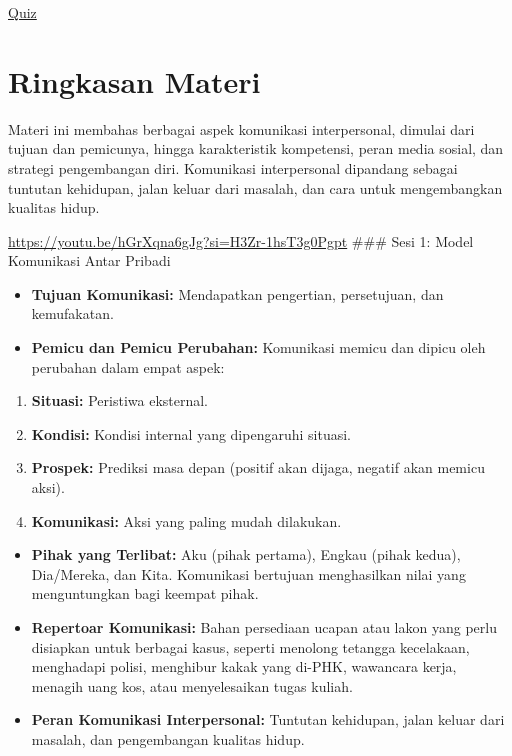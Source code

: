 \documentclass[
  letterpaper,
  DIV=11,
  numbers=noendperiod]{scrreprt}
\providecommand{\tightlist}{%
  \setlength{\itemsep}{0pt}\setlength{\parskip}{0pt}}
\begin{document}
\href{https://forms.office.com/r/WCHBJJiwXc}{Quiz}

\section{Ringkasan Materi}\label{ringkasan-materi}

Materi ini membahas berbagai aspek komunikasi interpersonal, dimulai
dari tujuan dan pemicunya, hingga karakteristik kompetensi, peran media
sosial, dan strategi pengembangan diri. Komunikasi interpersonal
dipandang sebagai tuntutan kehidupan, jalan keluar dari masalah, dan
cara untuk mengembangkan kualitas hidup.

\url{https://youtu.be/hGrXqna6gJg?si=H3Zr-1hsT3g0Pgpt} \#\#\# Sesi 1:
Model Komunikasi Antar Pribadi

\begin{itemize}
\tightlist
\item
  \textbf{Tujuan Komunikasi:} Mendapatkan pengertian, persetujuan, dan
  kemufakatan.
\item
  \textbf{Pemicu dan Pemicu Perubahan:} Komunikasi memicu dan dipicu
  oleh perubahan dalam empat aspek:
\end{itemize}

\begin{enumerate}
\def\labelenumi{\arabic{enumi}.}
\tightlist
\item
  \textbf{Situasi:} Peristiwa eksternal.
\item
  \textbf{Kondisi:} Kondisi internal yang dipengaruhi situasi.
\item
  \textbf{Prospek:} Prediksi masa depan (positif akan dijaga, negatif
  akan memicu aksi).
\item
  \textbf{Komunikasi:} Aksi yang paling mudah dilakukan.
\end{enumerate}

\begin{itemize}
\tightlist
\item
  \textbf{Pihak yang Terlibat:} Aku (pihak pertama), Engkau (pihak
  kedua), Dia/Mereka, dan Kita. Komunikasi bertujuan menghasilkan nilai
  yang menguntungkan bagi keempat pihak.
\item
  \textbf{Repertoar Komunikasi:} Bahan persediaan ucapan atau lakon yang
  perlu disiapkan untuk berbagai kasus, seperti menolong tetangga
  kecelakaan, menghadapi polisi, menghibur kakak yang di-PHK, wawancara
  kerja, menagih uang kos, atau menyelesaikan tugas kuliah.
\item
  \textbf{Peran Komunikasi Interpersonal:} Tuntutan kehidupan, jalan
  keluar dari masalah, dan pengembangan kualitas hidup.
\end{itemize}
\end{document}
